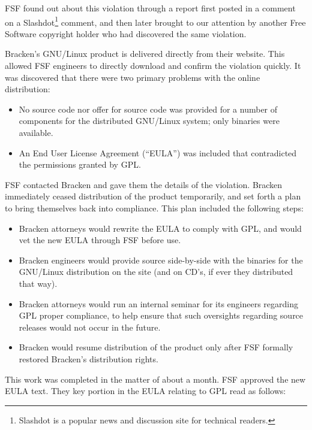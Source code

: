 \documentclass[12pt]{report}
\begin{document}
FSF found out about this violation through a report first posted in a
comment on a Slashdot\footnote{Slashdot is a popular news and discussion
  site for technical readers.} comment, and then later brought to our
attention by another Free Software copyright holder who had discovered the
same violation.

Bracken's GNU/Linux product is delivered directly from their website.
This allowed FSF engineers to directly download and confirm the violation
quickly.  It was discovered that there were two primary problems with the
online distribution:

\begin{itemize}

\item No source code nor offer for source code was provided for a number
  of components for the distributed GNU/Linux system; only binaries were
  available.

\item An End User License Agreement (``EULA'') was included that
  contradicted the permissions granted by GPL\@.
\end{itemize}

FSF contacted Bracken and gave them the details of the violation. Bracken
immediately ceased distribution of the product temporarily, and set forth
a plan to bring themselves back into compliance.  This plan included the
following steps:

\begin{itemize}

\item Bracken attorneys would rewrite the EULA to comply with GPL, and
  would vet the new EULA through FSF before use.

\item Bracken engineers would provide source side-by-side with the
  binaries for the GNU/Linux distribution on the site (and on CD's, if
  ever they distributed that way).

\item Bracken attorneys would run an internal seminar for its engineers
  regarding GPL proper compliance, to help ensure that such oversights
  regarding source releases would not occur in the future.

\item Bracken would resume distribution of the product only after FSF
  formally restored Bracken's distribution rights.
\end{itemize}

This work was completed in the matter of about a month.  FSF approved the
new EULA text.  They key portion in the EULA relating to GPL read as
follows:
\end{document}
